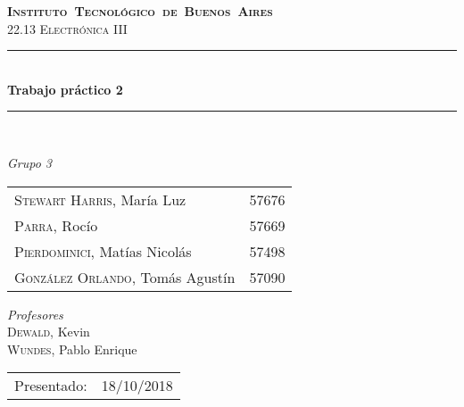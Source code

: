 \begin{titlepage}
\newcommand{\HRule}{\rule{\linewidth}{0.5mm}}
\center
\mbox{\textsc{\LARGE \bfseries {Instituto Tecnol\'ogico de Buenos Aires}}}\\[1.5cm]
\textsc{\Large 22.13 Electr\'onica III}\\[0.5cm]


\HRule \\[0.6cm]
{ \Huge \bfseries Trabajo pr\'actico 2}\\[0.4cm] %
\HRule \\[1.5cm]


{\large

\emph{Grupo 3}\\
\vspace{3px}

\begin{tabular}{lr} 	
\textsc{Stewart Harris}, Mar\'ia Luz  & 57676 \\ 	
\textsc{Parra}, Roc\'io  & 57669 \\ 	
\textsc{Pierdominici}, Mat\'ias Nicol\'as & 57498 \\     
\textsc{Gonz\'alez Orlando}, Tom\'as Agust\'in  & 57090 
\end{tabular}

\vspace{20px}

\emph{Profesores}\\
\vspace{3px}
\textsc{Dewald,} Kevin\\ 	
\textsc{Wundes,} Pablo Enrique\\

\vspace{100px}

\begin{tabular}{ll}

Presentado: & 18/10/2018\\

\end{tabular}

}

\vfill

\end{titlepage}